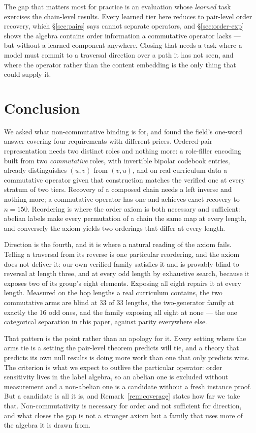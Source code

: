 \documentclass[10pt]{article}
\begin{document}
The gap that matters most for practice is an evaluation whose \emph{learned} task exercises the chain-level results. Every learned tier here reduces to pair-level order recovery, which \S\ref{sec:pairs} says cannot separate operators, and \S\ref{sec:order-exp} shows the algebra contains order information a commutative operator lacks --- but without a learned component anywhere. Closing that needs a task where a model must commit to a traversal direction over a path it has not seen, and where the operator rather than the content embedding is the only thing that could supply it.


\section{Conclusion}
\label{sec:conclusion}

We asked what non-commutative binding is for, and found the field's one-word answer covering four requirements with different prices. Ordered-pair representation needs two distinct roles and nothing more: a role-filler encoding built from two \emph{commutative} roles, with invertible bipolar codebook entries, already distinguishes $(u,v)$ from $(v,u)$, and on real curriculum data a commutative operator given that construction matches the verified one at every stratum of two tiers. Recovery of a composed chain needs a left inverse and nothing more; a commutative operator has one and achieves exact recovery to $n = 150$. Reordering is where the order axiom is both necessary and sufficient: abelian labels make every permutation of a chain the same map at every length, and conversely the axiom yields two orderings that differ at every length.

Direction is the fourth, and it is where a natural reading of the axiom fails. Telling a traversal from its reverse is one particular reordering, and the axiom does not deliver it: our own verified family satisfies it and is provably blind to reversal at length three, and at every odd length by exhaustive search, because it exposes two of its group's eight elements. Exposing all eight repairs it at every length. Measured on the hop lengths a real curriculum contains, the two commutative arms are blind at 33 of 33 lengths, the two-generator family at exactly the 16 odd ones, and the family exposing all eight at none --- the one categorical separation in this paper, against parity everywhere else.

That pattern is the point rather than an apology for it. Every setting where the arms tie is a setting the pair-level theorem predicts will tie, and a theory that predicts its own null results is doing more work than one that only predicts wins. The criterion is what we expect to outlive the particular operator: order sensitivity lives in the label algebra, so an abelian one is excluded without measurement and a non-abelian one is a candidate without a fresh instance proof. But a candidate is all it is, and Remark~\ref{rem:coverage} states how far we take that. Non-commutativity is necessary for order and not sufficient for direction, and what closes the gap is not a stronger axiom but a family that uses more of the algebra it is drawn from.
\end{document}
